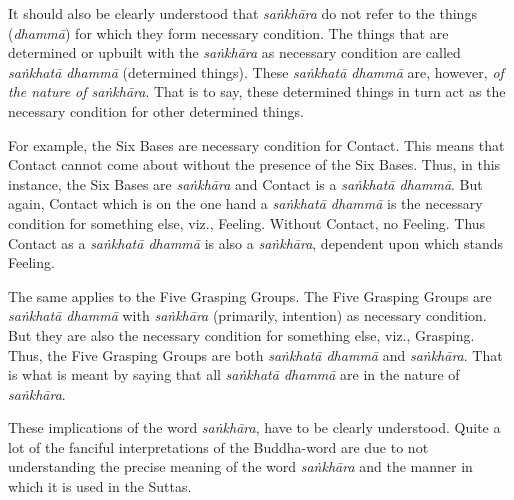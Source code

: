 It should also be clearly understood that \textit{saṅkhāra} do not refer to the things (\textit{dhammā}) for which they form necessary condition. The things that are determined or upbuilt with the \textit{saṅkhāra} as necessary condition are called \textit{saṅkhatā dhammā} (determined things). These \textit{saṅkhatā dhammā} are, however, \emph{of the nature of saṅkhāra}. That is to say, these determined things in turn act as the necessary condition for other determined things.

For example, the Six Bases are necessary condition for Contact. This means that Contact cannot come about without the presence of the Six Bases. Thus, in this instance, the Six Bases are \textit{saṅkhāra} and Contact is a \textit{saṅkhatā dhammā}. But again, Contact which is on the one hand a \textit{saṅkhatā dhammā} is the necessary condition for something else, viz., Feeling. Without Contact, no Feeling. Thus Contact as a \textit{saṅkhatā dhammā} is also a \textit{saṅkhāra}, dependent upon which stands Feeling.

The same applies to the Five Grasping Groups. The Five Grasping Groups are \textit{saṅkhatā dhammā} with \textit{saṅkhāra} (primarily, intention) as necessary condition. But they are also the necessary condition for something else, viz., Grasping. Thus, the Five Grasping Groups are both \textit{saṅkhatā dhammā} and \textit{saṅkhāra}. That is what is meant by saying that all \textit{saṅkhatā dhammā} are in the nature of \textit{saṅkhāra}.

These implications of the word \textit{saṅkhāra}, have to be clearly understood. Quite a lot of the fanciful interpretations of the Buddha-word are due to not understanding the precise meaning of the word \textit{saṅkhāra} and the manner in which it is used in the Suttas.

